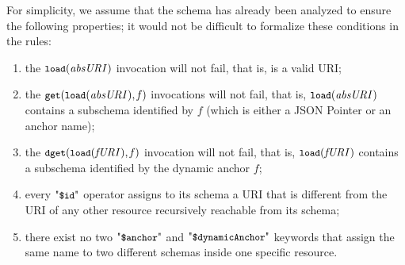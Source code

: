 



For simplicity, we assume that the schema has already been analyzed to ensure the following properties; it would not be difficult
to formalize these conditions in the rules:
\begin{enumerate}
\item the $\mbox{\tt{\small load}}(\mathit{absURI})$ invocation will not fail, that is,  is a valid URI;
\item the $\mbox{\tt{\small get}}(\mbox{\tt{\small load}}(\mathit{absURI}),\mathit{f})$ invocations will not fail, that is, 
     $\mbox{\tt{\small load}}(\mathit{absURI})$ contains a subschema identified by $f$ (which is either a JSON Pointer
      or an anchor name);
\item the $\mbox{\tt{\small dget}}(\mbox{\tt{\small load}}(\mathit{fURI}),\mathit{f})$ invocation will not fail, that is, 
     $\mbox{\tt{\small load}}(\mathit{fURI})$ contains a subschema identified by the dynamic anchor $f$;
\item every $\qdid$ operator assigns to its schema a URI that is different from the
   URI of any other resource recursively reachable from its schema;
\item there exist no two $\qda$ and $\qdda$ keywords that assign the same name 
to two different schemas inside one specific resource.
\end{enumerate}

